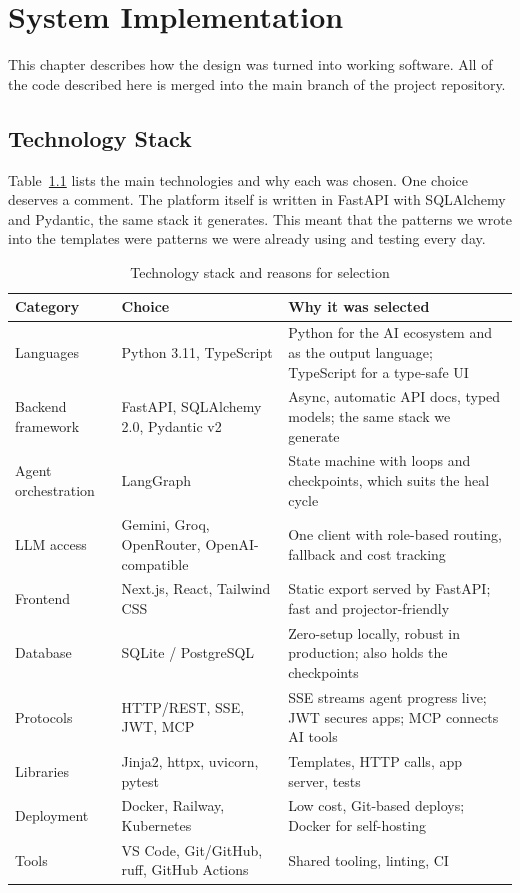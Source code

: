 \documentclass[12pt,a4paper]{report}
\begin{document}
\chapter{System Implementation}

This chapter describes how the design was turned into working software. All of the code described here is merged into the main branch of the project repository.

\section{Technology Stack}

Table~\ref{tab:tech} lists the main technologies and why each was chosen. One choice deserves a comment. The platform itself is written in FastAPI with SQLAlchemy and Pydantic, the same stack it generates. This meant that the patterns we wrote into the templates were patterns we were already using and testing every day.

\begin{table}[!ht]
    \centering
    \renewcommand{\arraystretch}{1.3}
    \caption{Technology stack and reasons for selection}
    \label{tab:tech}
    \begin{tabular}{|p{3.2cm}|p{4.2cm}|p{6.2cm}|}
    \hline
    \textbf{Category} & \textbf{Choice} & \textbf{Why it was selected} \\\hline
    Languages & Python 3.11, TypeScript & Python for the AI ecosystem and as the output language; TypeScript for a type-safe UI \\\hline
    Backend framework & FastAPI, SQLAlchemy 2.0, Pydantic v2 & Async, automatic API docs, typed models; the same stack we generate \\\hline
    Agent orchestration & LangGraph & State machine with loops and checkpoints, which suits the heal cycle \\\hline
    LLM access & Gemini, Groq, OpenRouter, OpenAI-compatible & One client with role-based routing, fallback and cost tracking \\\hline
    Frontend & Next.js, React, Tailwind CSS & Static export served by FastAPI; fast and projector-friendly \\\hline
    Database & SQLite / PostgreSQL & Zero-setup locally, robust in production; also holds the checkpoints \\\hline
    Protocols & HTTP/REST, SSE, JWT, MCP & SSE streams agent progress live; JWT secures apps; MCP connects AI tools \\\hline
    Libraries & Jinja2, httpx, uvicorn, pytest & Templates, HTTP calls, app server, tests \\\hline
    Deployment & Docker, Railway, Kubernetes & Low cost, Git-based deploys; Docker for self-hosting \\\hline
    Tools & VS Code, Git/GitHub, ruff, GitHub Actions & Shared tooling, linting, CI \\\hline
    \end{tabular}
\end{table}
\end{document}
